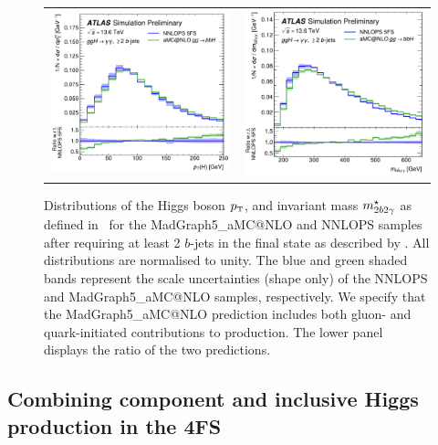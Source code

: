 \documentclass[11pt,a4paper]{article}
\begin{document}
\begin{figure}[t!]
\begin{center}
\begin{tabular}{cc}
\includegraphics[width=.45\textwidth, page=1]{plots/ATLAS/BJetCuts_Higgs1_Pt_shape_comparison_ratio.pdf}&
\includegraphics[width=.44\textwidth, page=1]{plots/ATLAS/BJetCuts_yybb_Mass_shape_comparison_ratio.pdf}
\end{tabular}
\vspace*{1ex}
\caption{Distributions of the Higgs boson $\pt$, and invariant mass $m_{2b2\gamma}^{\star}$ as defined in~  for the {\sc MadGraph5\_aMC@NLO} and {\sc NNLOPS} samples after requiring at least 2 $b$-jets in the final state as described by . All distributions are normalised to unity. The blue and green shaded bands represent the scale uncertainties (shape only) of the {\sc NNLOPS} and {\sc MadGraph5\_aMC@NLO} samples, respectively. We specify that the  {\sc MadGraph5\_aMC@NLO} prediction includes both gluon- and quark-initiated contributions to \bbH{} production. The lower panel displays the ratio of the two predictions.~\cite{atlaspub}\label{fig:4fsNNLOPS}}
\end{center}
\end{figure}

\subsection[Combining $y_t^2$ \bbH{} component and inclusive Higgs production in the 4FS]{Combining  \bbH{} component and inclusive Higgs production in the 4FS}
\end{document}
